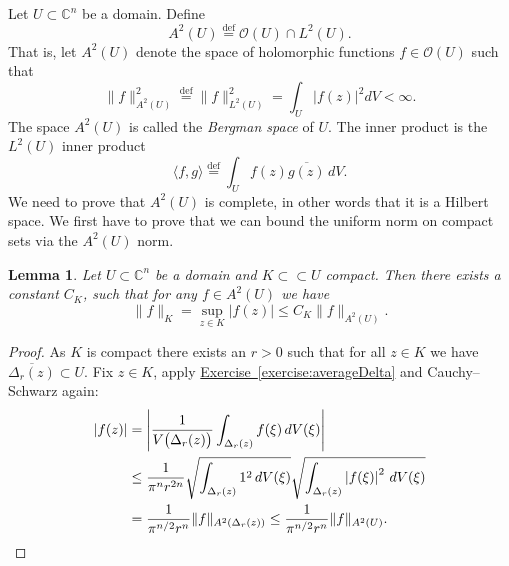 \documentclass[12pt,openany]{book}
\newcommand{\linnprod}[2]{\langle #1 , #2 \rangle}
\newcommand{\sabs}[1]{\lvert {#1} \rvert}
\newcommand{\snorm}[1]{\lVert {#1} \rVert}
\newcommand{\abs}[1]{\left\lvert {#1} \right\rvert}
\newcommand{\C}{{\mathbb{C}}}
\newcommand{\sO}{{\mathscr{O}}}
\newcommand{\myindex}[1]{#1\index{#1}}
\theoremstyle{plain}
\newtheorem{lemma}[thm]{Lemma}
\theoremstyle{remark}
\theoremstyle{definition}
\theoremstyle{exercise}
\theoremstyle{example}
\newcommand{\exerciseref}[1]{\hyperref[#1]{Exercise~\ref*{#1}}}
\begin{document}
Let $U \subset \C^n$ be a domain.  Define
\begin{equation*}
A^2(U) \overset{\text{def}}{=} \sO(U) \cap L^2(U) .
\end{equation*}
That is, let $A^2(U)$ denote the space
of holomorphic functions $f \in \sO(U)$ such that
\begin{equation*}
\snorm{f}_{A^2(U)}^2 \overset{\text{def}}{=} \snorm{f}_{L^2(U)}^2
= \int_U \sabs{f(z)}^2 dV < \infty .
\end{equation*}
The space $A^2(U)$ is called the
\emph{\myindex{Bergman space}} of $U$.
The inner product is the $L^2(U)$ inner product
\begin{equation*}
\linnprod{f}{g} \overset{\text{def}}{=} \int_U f(z) \overline{g(z)} \, dV .
\end{equation*}
We need to prove that $A^2(U)$ is
complete, in other words that it is a Hilbert space.  We first
have to prove that we can bound
the uniform norm on compact sets via the $A^2(U)$ norm.

\begin{lemma} \label{lemma:bergmanKbound}
Let $U \subset \C^n$ be a domain and $K \subset \subset U$ compact.  Then
there exists a constant $C_K$, such that for any $f\in A^2(U)$ we have
\begin{equation*}
\snorm{f}_K
=
\sup_{z \in K} \sabs{f(z)} 
\leq C_K \snorm{f}_{A^2(U)} .
\end{equation*}
\end{lemma}

\begin{proof}
As $K$ is compact there exists an $r > 0$ such that for all $z \in K$
we have $\overline{\Delta_r(z)} \subset U$.  Fix $z \in K$,
apply \exerciseref{exercise:averageDelta} and Cauchy--Schwarz again:
\begin{equation*}
\begin{split}
\abs{f(z)} &=
\abs{\frac{1}{V\bigl(\Delta_r(z)\bigr)} \int_{\Delta_r(z)} f(\xi) \,
dV(\xi)}
\\
& \leq
\frac{1}{\pi^n r^{2n}}
\sqrt{\int_{\Delta_r(z)} 1^2 \, dV(\xi)}
\sqrt{\int_{\Delta_r(z)} \abs{f(\xi)}^2 \, dV(\xi)}
\\
& =
\frac{1}{\pi^{n/2} r^n}
\snorm{f}_{A^2(\Delta_r(z))} 
\leq
\frac{1}{\pi^{n/2} r^n}
\snorm{f}_{A^2(U)} . \qedhere
\end{split}
\end{equation*}
\end{proof}
\end{document}
